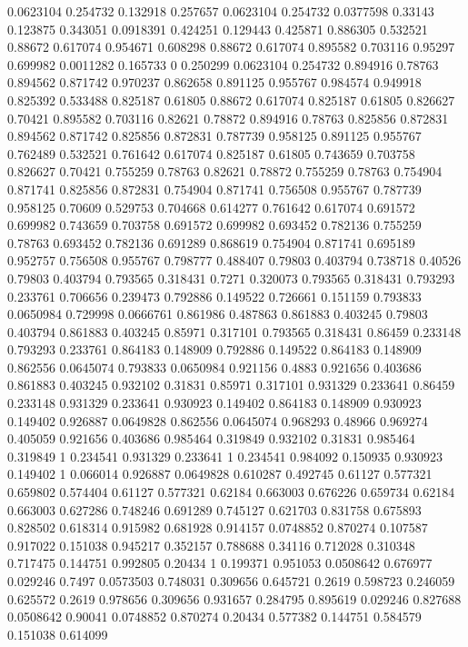 0.0623104 0.254732
0.132918 0.257657
0.0623104 0.254732
0.0377598 0.33143
0.123875 0.343051
0.0918391 0.424251
0.129443 0.425871
0.886305 0.532521
0.88672 0.617074
0.954671 0.608298
0.88672 0.617074
0.895582 0.703116
0.95297 0.699982
0.0011282 0.165733
0 0.250299
0.0623104 0.254732
0.894916 0.78763
0.894562 0.871742
0.970237 0.862658
0.891125 0.955767
0.984574 0.949918
0.825392 0.533488
0.825187 0.61805
0.88672 0.617074
0.825187 0.61805
0.826627 0.70421
0.895582 0.703116
0.82621 0.78872
0.894916 0.78763
0.825856 0.872831
0.894562 0.871742
0.825856 0.872831
0.787739 0.958125
0.891125 0.955767
0.762489 0.532521
0.761642 0.617074
0.825187 0.61805
0.743659 0.703758
0.826627 0.70421
0.755259 0.78763
0.82621 0.78872
0.755259 0.78763
0.754904 0.871741
0.825856 0.872831
0.754904 0.871741
0.756508 0.955767
0.787739 0.958125
0.70609 0.529753
0.704668 0.614277
0.761642 0.617074
0.691572 0.699982
0.743659 0.703758
0.691572 0.699982
0.693452 0.782136
0.755259 0.78763
0.693452 0.782136
0.691289 0.868619
0.754904 0.871741
0.695189 0.952757
0.756508 0.955767
0.798777 0.488407
0.79803 0.403794
0.738718 0.40526
0.79803 0.403794
0.793565 0.318431
0.7271 0.320073
0.793565 0.318431
0.793293 0.233761
0.706656 0.239473
0.792886 0.149522
0.726661 0.151159
0.793833 0.0650984
0.729998 0.0666761
0.861986 0.487863
0.861883 0.403245
0.79803 0.403794
0.861883 0.403245
0.85971 0.317101
0.793565 0.318431
0.86459 0.233148
0.793293 0.233761
0.864183 0.148909
0.792886 0.149522
0.864183 0.148909
0.862556 0.0645074
0.793833 0.0650984
0.921156 0.4883
0.921656 0.403686
0.861883 0.403245
0.932102 0.31831
0.85971 0.317101
0.931329 0.233641
0.86459 0.233148
0.931329 0.233641
0.930923 0.149402
0.864183 0.148909
0.930923 0.149402
0.926887 0.0649828
0.862556 0.0645074
0.968293 0.48966
0.969274 0.405059
0.921656 0.403686
0.985464 0.319849
0.932102 0.31831
0.985464 0.319849
1 0.234541
0.931329 0.233641
1 0.234541
0.984092 0.150935
0.930923 0.149402
1 0.066014
0.926887 0.0649828
0.610287 0.492745
0.61127 0.577321
0.659802 0.574404
0.61127 0.577321
0.62184 0.663003
0.676226 0.659734
0.62184 0.663003
0.627286 0.748246
0.691289 0.745127
0.621703 0.831758
0.675893 0.828502
0.618314 0.915982
0.681928 0.914157
0.0748852 0.870274
0.107587 0.917022
0.151038 0.945217
0.352157 0.788688
0.34116 0.712028
0.310348 0.717475
0.144751 0.992805
0.20434 1
0.199371 0.951053
0.0508642 0.676977
0.029246 0.7497
0.0573503 0.748031
0.309656 0.645721
0.2619 0.598723
0.246059 0.625572
0.2619 0.978656
0.309656 0.931657
0.284795 0.895619
0.029246 0.827688
0.0508642 0.90041
0.0748852 0.870274
0.20434 0.577382
0.144751 0.584579
0.151038 0.614099
